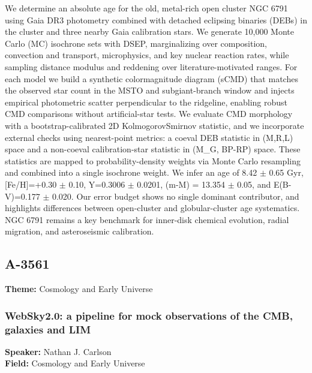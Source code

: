We determine an absolute age for the old, metal-rich open cluster NGC 6791 using Gaia DR3 photometry combined with detached eclipsing binaries (DEBs) in the cluster and three nearby Gaia calibration stars. We generate 10,000 Monte Carlo (MC) isochrone sets with DSEP, marginalizing over composition, convection and transport, microphysics, and key nuclear reaction rates, while sampling distance modulus and reddening over literature-motivated ranges. For each model we build a synthetic colormagnitude diagram (sCMD) that matches the observed star count in the MSTO and subgiant-branch window and injects empirical photometric scatter perpendicular to the ridgeline, enabling robust CMD comparisons without artificial-star tests. We evaluate CMD morphology with a bootstrap-calibrated 2D KolmogorovSmirnov statistic, and we incorporate external checks using nearest-point metrics: a coeval DEB statistic in (M,R,L) space and a non-coeval calibration-star statistic in (M\_G, BP-RP) space. These statistics are mapped to probability-density weights via Monte Carlo resampling and combined into a single isochrone weight. We infer an age of 8.42 $\pm$ 0.65 Gyr, [Fe/H]=+0.30 $\pm$ 0.10, Y=0.3006 $\pm$ 0.0201, (m-M) = 13.354 $\pm$ 0.05, and E(B-V)=0.177 $\pm$ 0.020. Our error budget shows no single dominant contributor, and highlights differences between open-cluster and globular-cluster age systematics. NGC 6791 remains a key benchmark for inner-disk chemical evolution, radial migration, and asteroseismic calibration.

\subsection*{A-3561}
\textbf{Theme:} Cosmology and Early Universe

\hypertarget{abstract-talk-293}{}\label{abstract-page-talk-293}
\subsubsection*{WebSky2.0: a pipeline for mock observations of the CMB, galaxies and LIM}
\textbf{Speaker:} Nathan J. Carlson\\
\textbf{Field:} Cosmology and Early Universe

